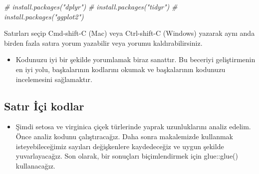 \documentclass[
  oneside]{book}
\newenvironment{Shaded}{\begin{snugshade}}{\end{snugshade}}
\newcommand{\CommentTok}[1]{\textcolor[rgb]{0.56,0.35,0.01}{\textit{#1}}}
\providecommand{\tightlist}{%
  \setlength{\itemsep}{0pt}\setlength{\parskip}{0pt}}
\begin{document}
\begin{Shaded}
\begin{Highlighting}[]
\CommentTok{\# install.packages("dplyr")}
\CommentTok{\# install.packages("tidyr")}
\CommentTok{\# install.packages("ggplot2")}
\end{Highlighting}
\end{Shaded}

\begin{info}
Satırları seçip Cmd-shift-C (Mac) veya Ctrl-shift-C (Windows) yazarak aynı anda birden fazla satıra yorum yazabilir veya yorumu kaldırabilirsiniz.

\end{info}

\begin{itemize}
\tightlist
\item
  Kodunuzu iyi bir şekilde yorumlamak biraz sanattır. Bu beceriyi geliştirmenin en iyi yolu, başkalarının kodlarını okumak ve başkalarının kodunuzu incelemesini sağlamaktır.
\end{itemize}

\hypertarget{inline-r}{%
\subsection{Satır İçi kodlar}\label{inline-r}}

\begin{itemize}
\tightlist
\item
  Şimdi setosa ve virginica çiçek türlerinde yaprak uzunluklarını analiz edelim. Önce analiz kodunu çalıştıracağız. Daha sonra makalemizde kullanmak isteyebileceğimiz sayıları değişkenlere kaydedeceğiz ve uygun şekilde yuvarlayacağız. Son olarak, bir sonuçları biçimlendirmek için glue::glue() kullanacağız.
\end{itemize}
\end{document}
